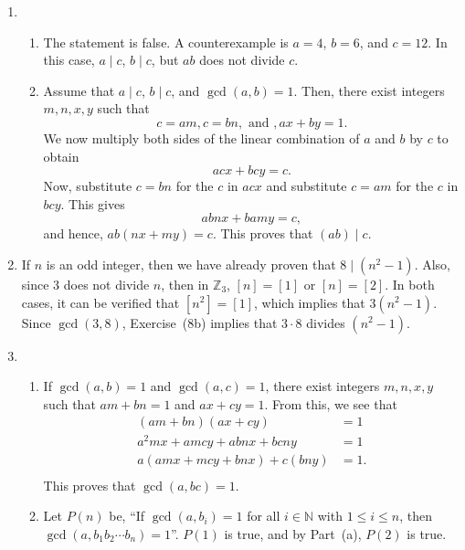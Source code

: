 \begin{enumerate}
\item \begin{enumerate}
\item The statement is false.  A counterexample is $a = 4$, $b = 6$, and $c = 12$.  In this case, 
$a \mid c$, $b \mid c$, but $ab$ does not divide $c$.

\item Assume that $a \mid c$, $b \mid c$, and $\gcd \left( a, b \right) = 1$.  Then, there exist integers $m, n, x, y$ such that
\[
c = am, c = bn, \text{ and }, ax + by = 1.
\]
We now multiply both sides of the linear combination of $a$ and $b$ by $c$ to obtain
\[
acx + bcy = c.
\]
Now, substitute $c = bn$ for the $c$ in $acx$ and substitute $c = am$ for the $c$ in $bcy$.  This gives
\[
abnx + bamy = c,
\]
and hence, $ab \left( nx + my \right) = c$.  This proves that $\left( ab \right) \mid c$.
\end{enumerate}

\item If $n$ is an odd integer, then we have already proven that $8 \mid \left( n^2 - 1 \right)$.  Also, since 3 does not divide $n$, then in $\mathbb{Z}_3$, $\left[ n \right] = \left[ 1 \right]$ or $\left[ n \right] = \left[ 2 \right]$.  In both cases, it can be verified that 
$\left[ n^2 \right] = \left[ 1 \right]$, which implies that $3 \left( n^2 -1 \right)$.  Since 
$\gcd \left( 3, 8 \right)$, Exercise~(8b) implies that $3 \cdot 8$ divides 
$\left( n^2 - 1 \right)$.

\item \begin{enumerate}
\item If $\gcd \left( {a, b} \right) = 1$ and  $\gcd \left( {a, c} \right) = 1$, there exist integers $m, n, x, y$ such that $am + bn = 1$ and $ax + cy = 1$.  From this, we see that
\[
\begin{aligned}
          \left( am + bn \right) \left( ax + cy \right) &= 1 \\
                              a^2 mx +amcy +abnx + bcny &= 1 \\
a \left( amx + mcy + bnx \right) + c \left( bny \right) &=1. \\
\end{aligned}
\]
This proves that $\gcd \left( a, bc \right) = 1$.

\item Let $P \left( n \right)$ be, ``If  $\gcd \left( {a, b_i } \right) = 1$ for all  
$i \in \mathbb{N}$ with  $1 \leq i \leq n$, then  
$\gcd \left( {a, b_1 b_2  \cdots b_n } \right) = 1$''.  $P \left( 1 \right)$ is true, and by 
Part~(a), $P \left( 2 \right)$ is true.


\end{enumerate}
\end{enumerate}
